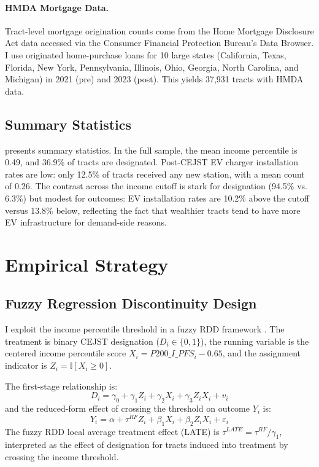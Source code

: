 \documentclass[12pt]{article}
\newcommand{\ind}{\mathbb{I}}
\begin{document}
\paragraph{HMDA Mortgage Data.} Tract-level mortgage origination counts come from the Home Mortgage Disclosure Act data accessed via the Consumer Financial Protection Bureau's Data Browser. I use originated home-purchase loans for 10 large states (California, Texas, Florida, New York, Pennsylvania, Illinois, Ohio, Georgia, North Carolina, and Michigan) in 2021 (pre) and 2023 (post). This yields 37,931 tracts with HMDA data.

\subsection{Summary Statistics}



 presents summary statistics. In the full sample, the mean income percentile is 0.49, and 36.9\% of tracts are designated. Post-CEJST EV charger installation rates are low: only 12.5\% of tracts received any new station, with a mean count of 0.26. The contrast across the income cutoff is stark for designation (94.5\% vs. 6.3\%) but modest for outcomes: EV installation rates are 10.2\% above the cutoff versus 13.8\% below, reflecting the fact that wealthier tracts tend to have more EV infrastructure for demand-side reasons.

\section{Empirical Strategy}

\subsection{Fuzzy Regression Discontinuity Design}

I exploit the income percentile threshold in a fuzzy RDD framework \citep{hahn2001identification, imbens2008regression}. The treatment is binary CEJST designation ($D_i \in \{0,1\}$), the running variable is the centered income percentile score $X_i = P200\_I\_PFS_i - 0.65$, and the assignment indicator is $Z_i = \ind[X_i \geq 0]$.

The first-stage relationship is:
\begin{equation}
D_i = \gamma_0 + \gamma_1 Z_i + \gamma_2 X_i + \gamma_3 Z_i X_i + v_i
\end{equation}
and the reduced-form effect of crossing the threshold on outcome $Y_i$ is:
\begin{equation}
Y_i = \alpha + \tau^{RF} Z_i + \beta_1 X_i + \beta_2 Z_i X_i + \varepsilon_i
\end{equation}
The fuzzy RDD local average treatment effect (LATE) is $\tau^{LATE} = \tau^{RF} / \gamma_1$, interpreted as the effect of designation for tracts induced into treatment by crossing the income threshold.
\end{document}
